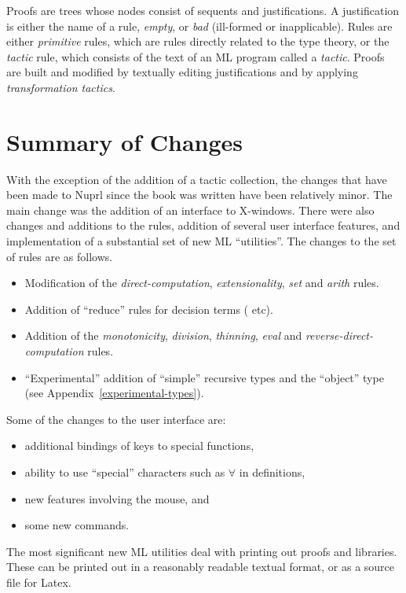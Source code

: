 Proofs are trees whose nodes consist of sequents and justifications.  A
justification is either the name of a rule, {\em empty}, or {\em bad}
(ill-formed or inapplicable).  Rules are either {\em primitive} rules,
which are rules directly related to the type theory, or the {\em tactic}
rule, which consists of the text of an ML program called a {\em tactic}.
Proofs are built and modified by textually editing justifications and by
applying {\em transformation tactics}.

\section{Summary of Changes}

With the exception of the addition of a tactic collection, the changes
that have been made to Nuprl since the book was written have been
relatively minor.  The main change was the addition of an interface to
X-windows.  There were also changes and additions to the rules,
addition of several user interface features, and implementation of a
substantial set of new ML ``utilities''.  The changes to the set of
rules are as follows.
\begin{itemize}
\item Modification of the  {\em direct-computation}, {\em
extensionality}, {\em set} and {\em arith} rules.
\item Addition of ``reduce'' rules for decision terms (
etc). 
\item Addition of the {\em monotonicity}, {\em division}, {\em
thinning}, {\em eval} and {\em reverse-direct-computation} rules.
\item ``Experimental'' addition of ``simple'' recursive types and 
the ``object'' type (see Appendix~\ref{experimental-types}).
\end{itemize}
Some of the changes to the user interface are:
\begin{itemize}
\item additional bindings of keys to special functions,
\item ability to use ``special'' characters such as $\forall$ in
definitions,
\item new features involving the mouse, and
\item some new commands.
\end{itemize}
The most significant new ML utilities deal with printing out proofs
and libraries.  These can be printed out in a reasonably readable
textual format, or as a source file for Latex.


